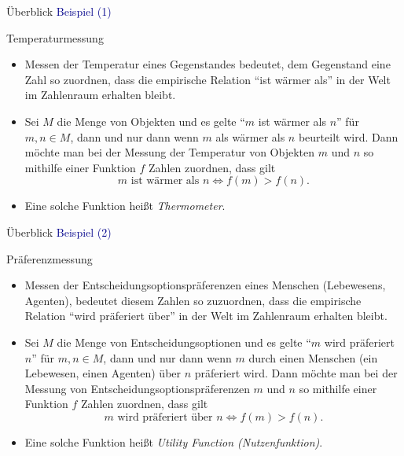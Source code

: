 \documentclass[
  8pt,
  ignorenonframetext,
]{beamer}
\begin{document}
\begin{frame}{Überblick}
\protect\hypertarget{uxfcberblick-2}{}
\textcolor{darkblue}{Beispiel (1)}

\small

Temperaturmessung

\begin{itemize}
\item
  \justifying Messen der Temperatur eines Gegenstandes bedeutet, dem
  Gegenstand eine Zahl so zuordnen, dass die empirische Relation ``ist
  wärmer als'' in der Welt im Zahlenraum erhalten bleibt.
\item
  Sei \(M\) die Menge von Objekten und es gelte ``\(m\) ist wärmer als
  \(n\)'' für \(m,n\in M\), dann und nur dann wenn \(m\) als wärmer als
  \(n\) beurteilt wird. Dann möchte man bei der Messung der Temperatur
  von Objekten \(m\) und \(n\) so mithilfe einer Funktion \(f\) Zahlen
  zuordnen, dass gilt \begin{equation}
  m \mbox{ ist wärmer als } n \Leftrightarrow f(m) > f(n).
  \end{equation}
\item
  Eine solche Funktion heißt \emph{Thermometer}.
\end{itemize}
\end{frame}

\begin{frame}{Überblick}
\protect\hypertarget{uxfcberblick-3}{}
\textcolor{darkblue}{Beispiel (2)}

\small

Präferenzmessung

\begin{itemize}
\item
  \justifying Messen der Entscheidungsoptionspräferenzen eines Menschen
  (Lebewesens, Agenten), bedeutet diesem Zahlen so zuzuordnen, dass die
  empirische Relation ``wird präferiert über'' in der Welt im Zahlenraum
  erhalten bleibt.
\item
  Sei \(M\) die Menge von Entscheidungsoptionen und es gelte ``\(m\)
  wird präferiert \(n\)'' für \(m,n\in M\), dann und nur dann wenn \(m\)
  durch einen Menschen (ein Lebewesen, einen Agenten) über \(n\)
  präferiert wird. Dann möchte man bei der Messung von
  Entscheidungsoptionspräferenzen \(m\) und \(n\) so mithilfe einer
  Funktion \(f\) Zahlen zuordnen, dass gilt \begin{equation}
  m \mbox{ wird präferiert über  } n \Leftrightarrow f(m) > f(n).
  \end{equation}
\item
  Eine solche Funktion heißt \emph{Utility Function (Nutzenfunktion)}.
\end{itemize}
\end{frame}
\end{document}
